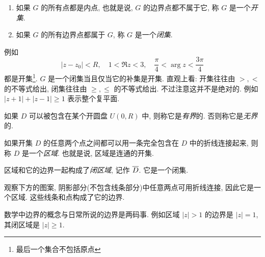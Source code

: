 \begin{definition}[开集和闭集]
  \begin{enumerate}
    \item 如果 $G$ 的所有点都是内点, 也就是说, $G$ 的边界点都不属于它, 称 $G$ 是一个\emph{开集}.
    \item 如果 $G$ 的所有边界点都属于 $G$, 称 $G$ 是一个\emph{闭集}.
  \end{enumerate}
\end{definition}
例如
  \[|z-z_0|<R,\quad 1<\Re z<3,\quad\frac\pi4<\arg z<\dfrac{3\pi}4\]
都是开集\footnote{最后一个集合不包括原点}.
$G$ 是一个闭集当且仅当它的补集是开集.
直观上看: 开集往往由 $>,<$ 的不等式给出, 闭集往往由 $\ge,\le$ 的不等式给出.
不过注意这并不是绝对的.
例如 $|z+1|+|z-1|\ge 1$ 表示整个复平面.

如果 $D$ 可以被包含在某个开圆盘 $U(0,R)$ 中, 则称它是\emph{有界}的.
否则称它是\emph{无界}的.

\begin{definition}[区域]
  如果开集 $D$ 的任意两个点之间都可以用一条完全包含在 $D$ 中的折线连接起来, 则称 $D$ 是一个\emph{区域}.
  也就是说, 区域是连通的开集.
\end{definition}
区域和它的边界一起构成了\emph{闭区域}, 记作 $\overline D$.
它是一个闭集.

观察下方的图案, 阴影部分(不包含线条部分)中任意两点可用折线连接, 因此它是一个区域.
这些线条和点构成了它的边界.

\begin{center}
\end{center}

数学中边界的概念与日常所说的边界是两码事. 例如区域 $|z|>1$ 的边界是 $|z|=1$, 其闭区域是 $|z|\ge 1$.

